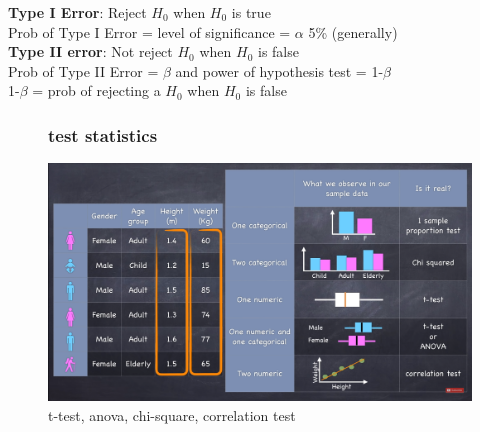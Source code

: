 \documentclass{beamer}
\begin{document}
{%
	\begin{frame}[plain]
	\vspace{2.5in}
	\textbf{Type I Error}: Reject $H_0$ when $H_0$ is true \\
	Prob of Type I Error = level of significance = $\alpha$  5\% (generally)\\
	\textbf{Type II error}: Not reject $H_0$ when $H_0$ is false \\
	Prob of Type II Error = $\beta$ and power of hypothesis test = 1-$\beta$ \\
	1-$\beta$ = prob of rejecting a $H_0$ when $H_0$ is false\\
	
	\end{frame}
}%




\begin{frame}%
\begin{figure}\frametitle{test statistics}
\includegraphics[scale=0.28]{TypesTests} 
\caption{t-test, anova, chi-square, correlation test}
\end{figure}
\end{frame}
\end{document}
